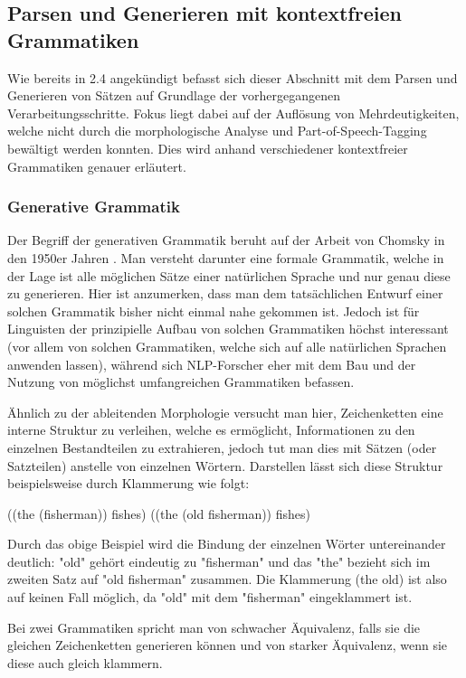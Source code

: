 \documentclass[12pt]{paper}
\begin{document}
\subsection{Parsen und Generieren mit kontextfreien Grammatiken}
Wie bereits in 2.4 angekündigt befasst sich dieser Abschnitt mit dem Parsen und Generieren von Sätzen auf Grundlage der vorhergegangenen Verarbeitungsschritte. Fokus liegt dabei auf der Auflösung von Mehrdeutigkeiten, welche nicht durch die morphologische Analyse und Part-of-Speech-Tagging bewältigt werden konnten. Dies wird anhand verschiedener kontextfreier Grammatiken genauer erläutert. 

\subsubsection{Generative Grammatik}
Der Begriff der generativen Grammatik beruht auf der Arbeit von Chomsky in den 1950er Jahren \cite{cho57}. Man versteht darunter eine formale Grammatik, welche in der Lage ist alle möglichen Sätze einer natürlichen Sprache und nur genau diese zu generieren. Hier ist anzumerken, dass man dem tatsächlichen Entwurf einer solchen Grammatik bisher nicht einmal nahe gekommen ist. Jedoch ist für Linguisten der prinzipielle Aufbau von solchen Grammatiken höchst interessant (vor allem von solchen Grammatiken, welche sich auf alle natürlichen Sprachen anwenden lassen), während sich NLP-Forscher eher mit dem Bau und der Nutzung von möglichst umfangreichen Grammatiken befassen. 

Ähnlich zu der ableitenden Morphologie versucht man hier, Zeichenketten eine interne Struktur zu verleihen, welche es ermöglicht, Informationen zu den einzelnen Bestandteilen zu extrahieren, jedoch tut man dies mit Sätzen (oder Satzteilen) anstelle von einzelnen Wörtern. Darstellen lässt sich diese Struktur beispielsweise durch Klammerung wie folgt:

((the (fisherman)) fishes)
((the (old fisherman)) fishes)

Durch das obige Beispiel wird die Bindung der einzelnen Wörter untereinander deutlich: "old" gehört eindeutig zu "fisherman" und das "the" bezieht sich im zweiten Satz auf "old fisherman" zusammen. Die Klammerung (the old) ist also auf keinen Fall möglich, da "old" mit dem "fisherman" eingeklammert ist. 

Bei zwei Grammatiken spricht man von schwacher Äquivalenz, falls sie die gleichen Zeichenketten generieren können und von starker Äquivalenz, wenn sie diese auch gleich klammern. 
\end{document}
